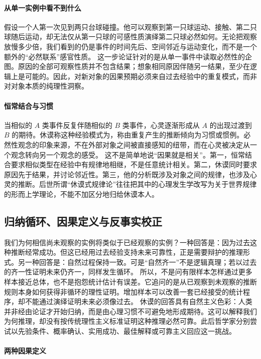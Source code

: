 \paragraph{从单一实例中看不到什么}

假设一个人第一次见到两只台球碰撞。他可以观察到第一只球运动、接触、第二只球随后运动，却无法仅从第一只球的可感性质演绎第二只球必然如何。无论把观察放慢多少倍，我们看到的仍是事件的时间先后、空间邻近与运动变化，而不是一个额外的“必然联系”感官性质。
这一步论证针对的是从单一事件中读取必然性的企图。原因的全部可观察性质并不包含结果；想象相同原因伴随另一结果，至少在逻辑上是可能的。因此，对新对象的因果预期必须来自过去经验中的重复模式，而非对对象本质的纯理性洞察。

\paragraph{恒常结合与习惯}

当相似的 $A$ 类事件反复伴随相似的 $B$ 类事件，心灵逐渐形成从 $A$ 的出现过渡到 $B$ 的期待。休谟称这种经验模式为，称由重复产生的推断倾向为习惯或惯例。必然性观念的印象来源，不在外部对象之间被直接感知的纽带，而在心灵被决定从一个观念转向另一个观念的感受。
这不是简单地说“因果就是相关”。第一，恒常结合要求相似类型在经验中有规律地相继，不是任意统计相关。第二，休谟同时要求原因先于结果，并讨论邻近性。第三，他的分析既涉及对象之间的规律，也涉及心灵的推断。后世所谓“休谟式规律论”往往把其中的心理发生学改写为关于世界规律的形而上学理论，不能不加区分地归给休谟本人。

\subsection{归纳循环、因果定义与反事实校正}

我们为何相信尚未观察的实例将类似于已经观察的实例？一种回答是：因为过去这种推断经常成功。但这已经用过去经验支持未来可靠性，正是需要辩护的推理形式。另一种回答是：自然过程保持一致。可是“自然齐一”不是逻辑真理；若以过去的齐一性证明未来仍齐一，同样发生循环。
所以，不是问有限样本怎样通过更多样本接近总体，也不是抱怨统计估计有误差。它追问的是从已观察到未观察的推断规则本身如何获得非循环的理性证明。增加样本可以改善一套已经接受的统计程序，却不能通过演绎证明未来必须像过去。
休谟的回答具有自然主义色彩：人类并非经由论证才开始归纳，而是由心理习惯不可避免地形成期待。这可以解释我们为何推理，却没有按传统理性主义标准证明这种推理必然可靠。此后哲学家分别尝试以先验条件、概率确认、实用成功、最佳解释或可靠主义回应这一挑战。

\paragraph{两种因果定义}

